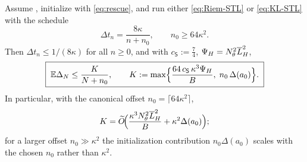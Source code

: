 \begin{theorem}
\label{thm:decreasing}
Assume , initialize with \eqref{eq:rescue},
and run either \eqref{eq:Riem-STL} or \eqref{eq:KL-STL} with the schedule
\begin{equation}
\label{eq:decreasing-schedule}
    \Delta t_n=\frac{8\kappa}{n+n_0},
    \qquad
    n_0\geq64\kappa^2 .
\end{equation}
Then $\Delta t_n\leq1/(8\kappa)$ for all $n\geq0$, and with $c_{\mathsf S}:=\tfrac74$,
$\Psi_H=N_\theta^2\overline{L}_H^2$,
\begin{equation}
\label{eq:decreasing-rate}
    \boxed{\;
    \mathbb{E}\Delta_N\leq\frac{K}{N+n_0},
    \qquad
    K:=\max\Bigl\{\frac{64\,c_{\mathsf S}\,\kappa^3\Psi_H}B,\;n_0\,\Delta(a_0)\Bigr\}.
    \;}
\end{equation}
In particular, with the canonical offset $n_0=\lceil64\kappa^2\rceil$,
\begin{equation}
\label{eq:decreasing-rate-canonical}
    K=\widetilde O\!\Bigl(\frac{\kappa^3N_\theta^2\overline{L}_H^2}B+\kappa^2\Delta(a_0)\Bigr);
\end{equation}
for a larger offset $n_0\gg\kappa^2$ the initialization contribution $n_0\Delta(a_0)$ scales with the
chosen $n_0$ rather than $\kappa^2$.
\end{theorem}

